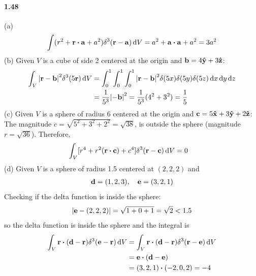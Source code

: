 \documentclass[../main.tex]{subfiles}
\begin{document}
\paragraph{1.48}
(a) 
\begin{align*}
    \int (r^2 + \vb{r} \vdot \vb{a} + a^2) \delta^3(\vb{r} - \vb{a}) \dd{V}
    = a^2 + \vb{a} \vdot \vb{a} + a^2 = 3a^2
\end{align*}
(b) Given $V$ is a cube of side 2 centered at the origin and $\vb{b} = 4\vu{y} + 3 \vu{z}$:
\begin{align*}
    \int_V \abs{\vb{r} - \vb{b}}^2 \delta^3(5\vb{r}) \dd{V} 
    &= \int_0^1 \int_0^1 \int_0^1 \abs{\vb{r} - \vb{b}}^2
    \delta(5x) \delta(5y) \delta(5z) \dd{x} \dd{y} \dd{z} \\
    &= \frac{1}{5^3} \abs{-\vb{b}}^2 = \frac{1}{5^3} (4^2 + 3^2) = \frac{1}{5}
\end{align*}
(c) Given $V$ is a sphere of radius 6 centered at the origin and
$\vb{c} = 5 \vu{x} + 3 \vu{y} + 2 \vu{z}$: \\
The magnitude $c = \sqrt{5^2 + 3^2 + 2^2} = \sqrt{38}$, is outside the sphere
(magnitude $r = \sqrt{36}$). Therefore,
\begin{align*}
    \int_V [r^4 + r^2(\vb{r} \vdot \vb{c}) + c^4] \delta^3(\vb{r} - \vb{c}) \dd{V} &= 0
\end{align*}
(d) Given $V$ is a sphere of radius 1.5 centered at $(2,2,2)$ and 
\begin{align*}
    \vb{d} = (1,2,3), \quad \vb{e} = (3,2,1) 
\end{align*}
Checking if the delta function is inside the sphere:
\begin{align*}
    \abs{\vb{e} - (2,2,2)} = \sqrt{1 + 0 + 1} = \sqrt{2} < 1.5
\end{align*}
so the delta function is inside the sphere and the integral is
\begin{align*}
    \int_V \vb{r} \vdot (\vb{d} - \vb{r}) \delta^3(\vb{e} - \vb{r}) \dd{V} 
    &= \int_V \vb{r} \vdot (\vb{d} - \vb{r}) \delta^3(\vb{r} - \vb{e}) \dd{V} \\
    &= \vb{e} \vdot (\vb{d} - \vb{e}) \\
    &= (3,2,1) \vdot (-2,0,2) = -4
\end{align*}
\end{document}
